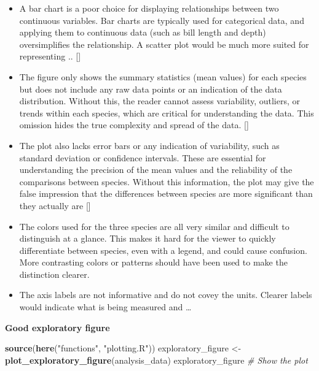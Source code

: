 \documentclass[
]{article}
\newenvironment{Shaded}{\begin{snugshade}}{\end{snugshade}}
\newcommand{\CommentTok}[1]{\textcolor[rgb]{0.56,0.35,0.01}{\textit{#1}}}
\newcommand{\FunctionTok}[1]{\textcolor[rgb]{0.13,0.29,0.53}{\textbf{#1}}}
\newcommand{\NormalTok}[1]{#1}
\newcommand{\OtherTok}[1]{\textcolor[rgb]{0.56,0.35,0.01}{#1}}
\newcommand{\StringTok}[1]{\textcolor[rgb]{0.31,0.60,0.02}{#1}}
\begin{document}
\begin{itemize}
\item
  A bar chart is a poor choice for displaying relationships between two
  continuous variables. Bar charts are typically used for categorical
  data, and applying them to continuous data (such as bill length and
  depth) oversimplifies the relationship. A scatter plot would be much
  more suited for representing .. {[}{]}
\item
  The figure only shows the summary statistics (mean values) for each
  species but does not include any raw data points or an indication of
  the data distribution. Without this, the reader cannot assess
  variability, outliers, or trends within each species, which are
  critical for understanding the data. This omission hides the true
  complexity and spread of the data. {[}{]}
\item
  The plot also lacks error bars or any indication of variability, such
  as standard deviation or confidence intervals. These are essential for
  understanding the precision of the mean values and the reliability of
  the comparisons between species. Without this information, the plot
  may give the false impression that the differences between species are
  more significant than they actually are {[}{]}
\item
  The colors used for the three species are all very similar and
  difficult to distinguish at a glance. This makes it hard for the
  viewer to quickly differentiate between species, even with a legend,
  and could cause confusion. More contrasting colors or patterns should
  have been used to make the distinction clearer.
\item
  The axis labels are not informative and do not covey the units.
  Clearer labels would indicate what is being measured and \ldots{}
\end{itemize}

\textbf{Good exploratory figure}

\begin{Shaded}
\begin{Highlighting}[]
\FunctionTok{source}\NormalTok{(}\FunctionTok{here}\NormalTok{(}\StringTok{"functions"}\NormalTok{, }\StringTok{"plotting.R"}\NormalTok{))}
\NormalTok{exploratory\_figure }\OtherTok{\textless{}{-}} \FunctionTok{plot\_exploratory\_figure}\NormalTok{(analysis\_data)}
\NormalTok{exploratory\_figure }\CommentTok{\# Show the plot}
\end{Highlighting}
\end{Shaded}
\end{document}
